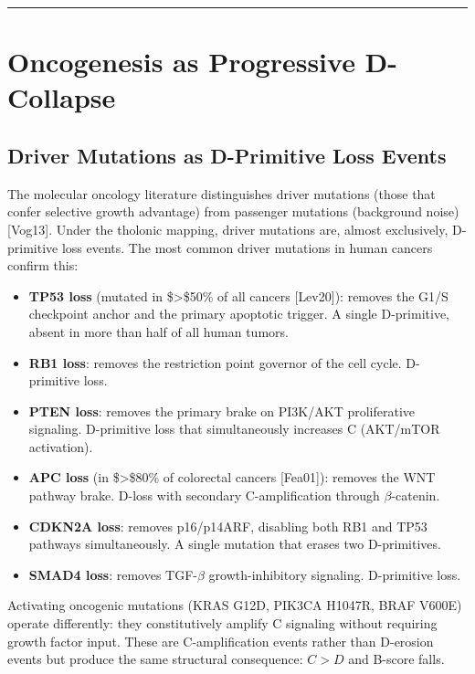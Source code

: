 \documentclass[12pt]{article}
\providecommand{\tightlist}{%
  \setlength{\itemsep}{0pt}\setlength{\parskip}{0pt}}
\begin{document}
\begin{center}\rule{0.5\linewidth}{0.5pt}\end{center}

\section{Oncogenesis as Progressive D-Collapse}\label{oncogenesis-as-progressive-d-collapse}

\subsection{Driver Mutations as D-Primitive Loss Events}\label{driver-mutations-as-d-primitive-loss-events}

The molecular oncology literature distinguishes driver mutations (those
that confer selective growth advantage) from passenger mutations
(background noise) {[}Vog13{]}. Under the tholonic mapping, driver
mutations are, almost exclusively, D-primitive loss events. The most
common driver mutations in human cancers confirm this:

\begin{itemize}
\tightlist
\item
  \textbf{TP53 loss} (mutated in \$\textgreater\$50\% of all cancers
  {[}Lev20{]}): removes the G1/S checkpoint anchor and the primary
  apoptotic trigger. A single D-primitive, absent in more than half of
  all human tumors.
\item
  \textbf{RB1 loss}: removes the restriction point governor of the cell
  cycle. D-primitive loss.
\item
  \textbf{PTEN loss}: removes the primary brake on PI3K/AKT
  proliferative signaling. D-primitive loss that simultaneously
  increases C (AKT/mTOR activation).
\item
  \textbf{APC loss} (in \$\textgreater\$80\% of colorectal cancers
  {[}Fea01{]}): removes the WNT pathway brake. D-loss with secondary
  C-amplification through \(\beta\)-catenin.
\item
  \textbf{CDKN2A loss}: removes p16/p14ARF, disabling both RB1 and TP53
  pathways simultaneously. A single mutation that erases two
  D-primitives.
\item
  \textbf{SMAD4 loss}: removes TGF-\(\beta\) growth-inhibitory
  signaling. D-primitive loss.
\end{itemize}

Activating oncogenic mutations (KRAS G12D, PIK3CA H1047R, BRAF V600E)
operate differently: they constitutively amplify C signaling without
requiring growth factor input. These are C-amplification events rather
than D-erosion events but produce the same structural consequence:
\(C > D\) and B-score falls.
\end{document}
